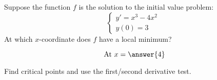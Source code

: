 \documentclass{ximera}
\author{Bobby Ramsey}
\begin{document}
\begin{exercise}
Suppose the function $f$ is the solution to the initial value problem:
\[  \begin{cases}
	y' = x^3 - 4x^2\\
	y(0) = 3
\end{cases}\]
At which $x$-coordinate does $f$ have a local minimum?

\[ \text{ At } x = \answer{4} \]
\begin{hint}
	Find critical points and use the first/second derivative test.
\end{hint}
\end{exercise}
\end{document}
